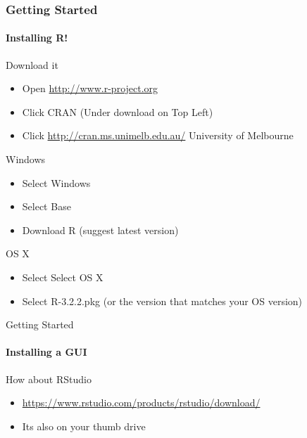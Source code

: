 \documentclass[12pt]{beamer}\usepackage[]{graphicx}\usepackage[]{color}
\begin{document}
\begin{frame}
  \frametitle{Getting Started}
  \framesubtitle{Installing R!}

  \begin{block}{Download it}
  \begin{itemize}
    \item Open \url{http://www.r-project.org}
    \item Click CRAN (Under download on Top Left)
    \item Click \url{http://cran.ms.unimelb.edu.au/} University of Melbourne
  \end{itemize}
  \end{block}

  \begin{block}{Windows}
  \begin{itemize}
    \item Select Windows
    \item Select Base
    \item Download R (suggest latest version)
  \end{itemize}
  \end{block}

  \begin{block}{OS X}
  \begin{itemize}
    \item Select Select OS X
    \item Select R-3.2.2.pkg (or the version that matches your OS version)
  \end{itemize}
  \end{block}

\end{frame}

\begin{frame}{Getting Started}
\framesubtitle{Installing a GUI}
\begin{block}{How about RStudio}
\begin{itemize}
\item \url{https://www.rstudio.com/products/rstudio/download/}
\item Its also on your thumb drive
\end{itemize}
\end{block}

\end{frame}
\end{document}
